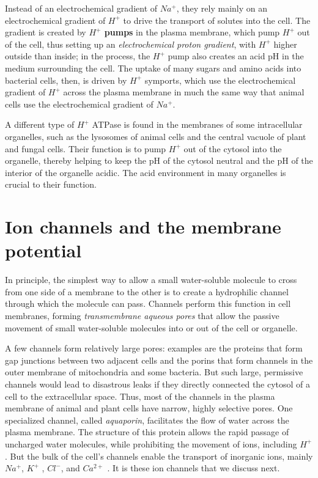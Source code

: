 Instead of an electrochemical gradient
of $Na^{+}$, they rely mainly on an electrochemical gradient of $H^{+}$ to drive the
transport of solutes into the cell. The gradient is created by \textbf{$H^{+}$ pumps} in
the plasma membrane, which pump $H^{+}$ out of the cell, thus setting up an
\textit{electrochemical proton gradient}, with $H^{+}$ higher outside than inside; in the
process, the $H^{+}$ pump also creates an acid pH in the medium surrounding
the cell. The uptake of many sugars and amino acids into bacterial cells,
then, is driven by $H^{+}$ symports, which use the electrochemical gradient of
$H^{+}$ across the plasma membrane in much the same way that animal cells
use the electrochemical gradient of $Na^{+}$.

A different type of $H^{+}$ ATPase is found in the membranes of some intracellular
organelles, such as the lysosomes of animal cells and the central
vacuole of plant and fungal cells. Their function is to pump $H^{+}$ out of the
cytosol into the organelle, thereby helping to keep the pH of the cytosol
neutral and the pH of the interior of the organelle acidic. The acid environment
in many organelles is crucial to their function.

\section{Ion channels and the membrane potential}

In principle, the simplest way to allow a small water-soluble molecule to
cross from one side of a membrane to the other is to create a hydrophilic
channel through which the molecule can pass. Channels perform this
function in cell membranes, forming \textit{transmembrane aqueous pores} that
allow the passive movement of small water-soluble molecules into or out
of the cell or organelle.

A few channels form relatively large pores: examples are the proteins
that form gap junctions between two adjacent cells and the porins that
form channels in the outer membrane of mitochondria and some bacteria. But such large, permissive
channels would lead to disastrous leaks if they directly connected the
cytosol of a cell to the extracellular space. Thus, most of the channels
in the plasma membrane of animal and plant cells have narrow, highly
selective pores. One specialized channel, called \textit{aquaporin}, facilitates the
flow of water across the plasma membrane. The structure of this protein
allows the rapid passage of uncharged water molecules, while prohibiting
the movement of ions, including $H^{+}$ . But the bulk of the cell’s channels
enable the transport of inorganic ions, mainly $Na^{+}$, $K^{+}$ , $Cl^{-}$, and $Ca^{2+}$ . It is
these ion channels that we discuss next.

